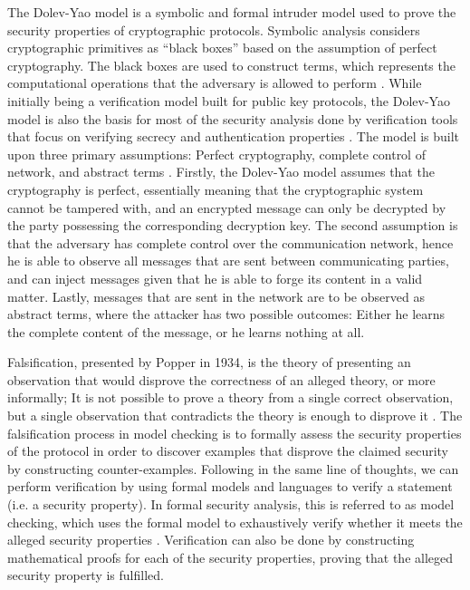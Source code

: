 The Dolev-Yao model is a symbolic and formal intruder model used to prove the security properties of cryptographic protocols. Symbolic analysis considers cryptographic primitives as ``black boxes'' based on the assumption of perfect cryptography. The black boxes are used to construct terms, which represents the computational operations that the adversary is allowed to perform \cite{blanchet2012security}. While initially being a verification model built for public key protocols, the Dolev-Yao model is also the basis for most of the security analysis done by verification tools that focus on verifying secrecy and authentication properties \cite{cremers2005operational}. The model is built upon three primary assumptions: Perfect cryptography, complete control of network, and abstract terms \cite{dolev1983security}. Firstly, the Dolev-Yao model assumes that the cryptography is perfect, essentially meaning that the cryptographic system cannot be tampered with, and an encrypted message can only be decrypted by the party possessing the corresponding decryption key. The second assumption is that the adversary has complete control over the communication network, hence he is able to observe all messages that are sent between communicating parties, and can inject messages given that he is able to forge its content in a valid matter. Lastly, messages that are sent in the network are to be observed as abstract terms, where the attacker has two possible outcomes: Either he learns the complete content of the message, or he learns nothing at all. 


Falsification, presented by Popper in 1934, is the theory of presenting an observation that would disprove the correctness of an alleged theory, or more informally; It is not possible to prove a theory from a single correct observation, but a single observation that contradicts the theory is enough to disprove it \cite{popper2005logic}. The falsification process in model checking is to formally assess the security properties of the protocol in order to discover examples that disprove the claimed security by constructing counter-examples. Following in the same line of thoughts, we can perform verification by using formal models and languages to verify a statement (i.e. a security property). In formal security analysis, this is referred to as model checking, which uses the formal model to exhaustively verify whether it meets the alleged security properties \cite{basin2011model}. Verification can also be done by constructing mathematical proofs for each of the security properties, proving that the alleged security property is fulfilled. 



